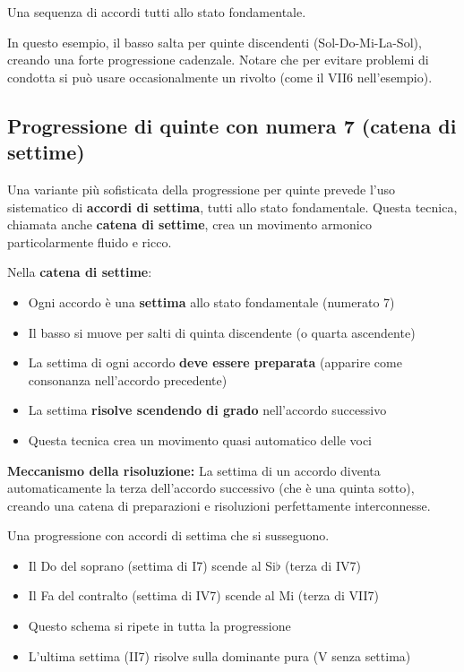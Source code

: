 \begin{esempio}
	\label{ex:progressione_5_sol}
	Una sequenza di accordi tutti allo stato fondamentale.
	
	In questo esempio, il basso salta per quinte discendenti (Sol-Do-Mi-La-Sol), creando una forte progressione cadenzale. Notare che per evitare problemi di condotta si può usare occasionalmente un rivolto (come il VII6 nell'esempio).
\end{esempio}

\subsection{Progressione di quinte con numera 7 (catena di settime)}
\label{subsec:progressione_quinte_7}

Una variante più sofisticata della progressione per quinte prevede l'uso sistematico di \textbf{accordi di settima}, tutti allo stato fondamentale. Questa tecnica, chiamata anche \textbf{catena di settime}, crea un movimento armonico particolarmente fluido e ricco.

\begin{regola}
	\label{reg:progressione_7}
	Nella \textbf{catena di settime}:
	
	\begin{itemize}
		\item Ogni accordo è una \textbf{settima} allo stato fondamentale (numerato 7)
		\item Il basso si muove per salti di quinta discendente (o quarta ascendente)
		\item La settima di ogni accordo \textbf{deve essere preparata} (apparire come consonanza nell'accordo precedente)
		\item La settima \textbf{risolve scendendo di grado} nell'accordo successivo
		\item Questa tecnica crea un movimento quasi automatico delle voci
	\end{itemize}
	
	\textbf{Meccanismo della risoluzione:}
	La settima di un accordo diventa automaticamente la terza dell'accordo successivo (che è una quinta sotto), creando una catena di preparazioni e risoluzioni perfettamente interconnesse.
\end{regola}

\begin{esempio}
	\label{ex:catena_settime}
	Una progressione con accordi di settima che si susseguono.
	\begin{itemize}
		\item Il Do del soprano (settima di I7) scende al Si$\flat$ (terza di IV7)
		\item Il Fa del contralto (settima di IV7) scende al Mi (terza di VII7)
		\item Questo schema si ripete in tutta la progressione
		\item L'ultima settima (II7) risolve sulla dominante pura (V senza settima)
	\end{itemize}
\end{esempio}

